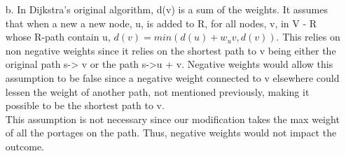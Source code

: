 \documentclass[12pt]{article}
\begin{document}
\begin{enumerate}
    \item[b.] In Dijkstra’s original algorithm, d(v) is a sum of the weights. It assumes that when a new 
    a new node, u, is added to R, for all nodes, v, in  V - R whose R-path contain u, 
    $d(v) = min(d(u) + w_uv, d(v))$. This relies on non negative weights since it relies on the shortest path
    to v being either the original path s-> v or the path  s->u + v. Negative weights would allow this 
    assumption to be false since a negative weight connected to v elsewhere could lessen the weight of another
    path, not mentioned previously, making it possible to be the shortest path to v.\\

    This assumption is not necessary since our modification takes the max weight of all the portages on the path.
    Thus, negative weights would not impact the outcome.\\
\end{enumerate}
\end{document}
